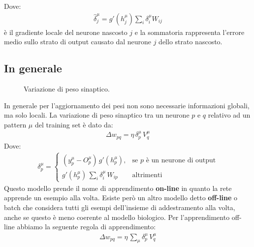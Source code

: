 	Dove:
	\begin{align*}
		\hat{\delta}_j^\mu = g'(h_j^\mu) \sum_i \delta^\mu_i W_{ij}
	\end{align*}
	è il gradiente locale del neurone nascosto $j$ e la sommatoria rappresenta l'errore medio sullo strato di output causato dal neurone $j$ dello strato nascosto.

	\newpage

	\subsection{In generale} %
	\label{ssub:in_generale}
	\begin{figure}[h!]
		\centering
		\caption{Variazione di peso sinaptico.}
	\end{figure}

	In generale per l'aggiornamento dei pesi non sono necessarie informazioni globali, ma solo locali. La variazione di peso sinaptico tra un neurone $p$ e $q$ relativo ad un pattern $\mu$ del training set è dato da:
	\begin{align}
		\Delta w_{pq} = \eta \, \delta^\mu_p \, V^\mu_q
	\end{align}
	Dove:
	\begin{align*}
		\delta_p^\mu =
		\begin{cases}
			(y^\mu_p - O^\mu_p) \, g'(h^\mu_p), &\text{se $p$ è un neurone di output} \\
			\displaystyle g'(h_p^\mu) \, \sum_i \delta^\mu_i \, W_{ip} &\text{altrimenti}
		\end{cases}
	\end{align*}
	Questo modello prende il nome di apprendimento \textbf{on-line} in quanto la rete apprende un esempio alla volta. Esiste però un altro modello detto \textbf{off-line} o batch che considera tutti gli esempi dell'insieme di addestramento alla volta, anche se questo è meno coerente al modello biologico. Per l'apprendimento off-line abbiamo la seguente regola di apprendimento:
	\begin{align}
		\Delta w_{pq} = \eta \, \sum_\mu \delta^\mu_p \, V^\mu_q
	\end{align}

